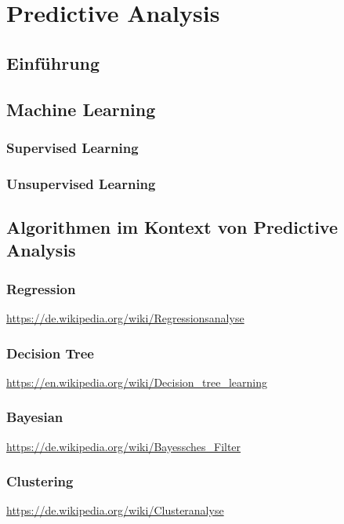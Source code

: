 \section{Predictive Analysis}

\subsection{Einführung}

\subsection{Machine Learning}

\subsubsection{Supervised Learning}

\subsubsection{Unsupervised Learning}

\subsection{Algorithmen im Kontext von Predictive Analysis}

\subsubsection{Regression}
\url{https://de.wikipedia.org/wiki/Regressionsanalyse}\\

\subsubsection{Decision Tree}
\url{https://en.wikipedia.org/wiki/Decision_tree_learning}\\

\subsubsection{Bayesian}
\url{https://de.wikipedia.org/wiki/Bayessches_Filter}\\

\subsubsection{Clustering}
\url{https://de.wikipedia.org/wiki/Clusteranalyse}\\

